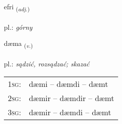 \documentclass[frontgrid, backgrid]{flacards}\usepackage[]{graphicx}\usepackage[]{xcolor}
\begin{document}
\renewcommand{\flhead}{\vskip5pt \fboxsep=0pt {\small\bfseries\footnotesize Lýsingarorð | Adjective}}
\renewcommand{\fcfoot}{\vskip5pt \fboxsep=0pt \hspace{2pt}{\small\bfseries\footnotesize 1K}}

\renewcommand{\blhead}{\vskip5pt {\small\bfseries\footnotesize Lýsingarorð | Adjective }}
\renewcommand{\bcfoot}{\vskip5pt \hspace{2pt}{\small\bfseries\footnotesize 1K}}


{efri \small{\textsubscript{(\textit{adj.})}} \\[1ex] %
\textphonetic{[ɛvrɪ]} \\
pl.: \emph{górny} \\  [2ex]
\renewcommand*{\arraystretch}{0.8}
}

\renewcommand{\flhead}{\vskip5pt \fboxsep=0pt {\small\bfseries\footnotesize Sagnorð | Verb}}
\renewcommand{\fcfoot}{\vskip5pt \fboxsep=0pt \hspace{2pt}{\small\bfseries\footnotesize 1K}}

\renewcommand{\blhead}{\vskip5pt {\small\bfseries\footnotesize Sagnorð | Verb }}
\renewcommand{\bcfoot}{\vskip5pt \hspace{2pt}{\small\bfseries\footnotesize 1K}}


{dæma \small{\textsubscript{(\textit{v.})}} \\[1ex] %
\textphonetic{[taiːma]} \\
pl.: \emph{sądzić, rozsądzać; skazać} \\  [2ex]
\renewcommand*{\arraystretch}{0.8}
\begin{tabular}{p{1cm}l}
\textsc{1sg}: & dæmi -- dæmdi -- dæmt \\ 
\textsc{2sg}: & dæmir -- dæmdir -- dæmt \\ 
\textsc{3sg}: & dæmir -- dæmdi -- dæmt \\ 
\end{tabular}
}
\end{document}

